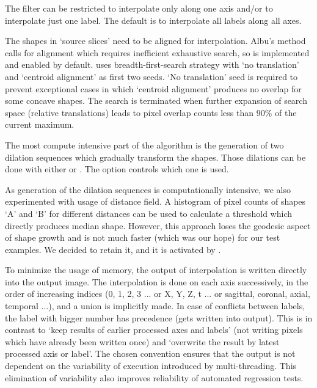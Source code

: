 \documentclass{InsightArticle}
\begin{document}
The filter can be restricted to interpolate only along one axis
and/or to interpolate just one label.
The default is to interpolate all labels along all axes.

The shapes in `source slices' need to be aligned for interpolation.
Albu's method~\cite{Albu2008} calls for alignment
which requires inefficient exhaustive search,
so  is implemented and enabled by default.
 uses breadth-first-search strategy
with `no translation' and `centroid alignment' as first two seeds.
`No translation' seed is required to prevent exceptional cases in which
`centroid alignment' produces no overlap for some concave shapes.
The search is terminated when further expansion of search space
(relative translations) leads to pixel overlap counts
less than 90\% of the current maximum.

The most compute intensive part of the algorithm
is the generation of two dilation sequences which gradually transform the shapes.
Those dilations can be done with either 
or .
The option  controls which one is used.

As generation of the dilation sequences is computationally intensive,
we also experimented with usage of distance field.
A histogram of pixel counts of shapes `A' and `B' for different distances
can be used to calculate a threshold which directly produces median shape.
However, this approach loses the geodesic aspect of shape growth and
is not much faster (which was our hope) for our test examples.
We decided to retain it, and it is activated by .

To minimize the usage of memory, the output of interpolation is written
directly into the output image.
The interpolation is done on each axis successively,
in the order of increasing indices (0, 1, 2, 3 ... or X, Y, Z, t ...
or sagittal, coronal, axial, temporal ...), and a union is implicitly made.
In case of conflicts between labels,
the label with bigger number has precedence (gets written into output).
This is in contrast to `keep results of earlier processed axes and labels'
(not writing pixels which have already been written once)
and `overwrite the result by latest processed axis or label'.
The chosen convention ensures that the output is not dependent on the
variability of execution introduced by multi-threading.
This elimination of variability also improves
reliability of automated regression tests.
\end{document}
